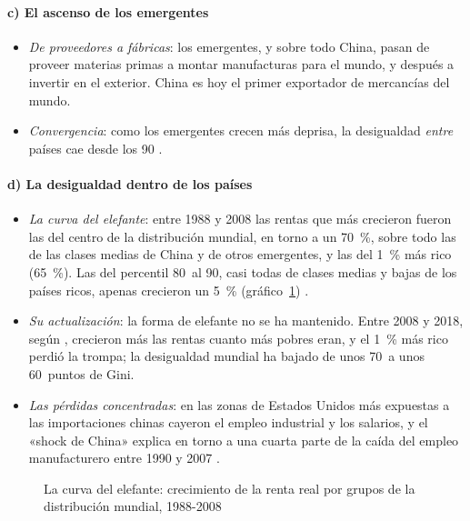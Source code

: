 \documentclass[11pt]{article}
\begin{document}
\paragraph{c) El ascenso de los emergentes}

\begin{itemize}
\item \emph{De proveedores a fábricas}: los emergentes, y sobre todo China, pasan de proveer materias primas a montar manufacturas para el mundo, y después a invertir en el exterior. China es hoy el primer exportador de mercancías del mundo\nocite{OMC2026GTOS}.
\item \emph{Convergencia}: como los emergentes crecen más deprisa, la desigualdad \emph{entre} países cae desde los 90\nocite{Milanovic2016} .
\end{itemize}

\paragraph{d) La desigualdad dentro de los países}

\begin{itemize}
\item \emph{La curva del elefante}: entre 1988 y 2008 las rentas que más crecieron fueron las del centro de la distribución mundial, en torno a un 70~\%, sobre todo las de las clases medias de China y de otros emergentes, y las del 1~\% más rico (65~\%). Las del percentil 80~al 90, casi todas de clases medias y bajas de los países ricos, apenas crecieron un 5~\% (gráfico~\ref{fig:elefante})\nocite{LaknerMilanovic2016} .
\item \emph{Su actualización}: la forma de elefante no se ha mantenido. Entre 2008 y 2018, según \textcite{Milanovic2024ThreeEras}, crecieron más las rentas cuanto más pobres eran, y el 1~\% más rico perdió la trompa; la desigualdad mundial ha bajado de unos 70~a unos 60~puntos de Gini.
\item \emph{Las pérdidas concentradas}: en las zonas de Estados Unidos más expuestas a las importaciones chinas cayeron el empleo industrial y los salarios, y el «shock de China» explica en torno a una cuarta parte de la caída del empleo manufacturero entre 1990 y 2007\nocite{AutorDornHanson2013China} .
\end{itemize}

\begin{figure}[H]
\centering
\caption{La curva del elefante: crecimiento de la renta real por grupos de la distribución mundial, 1988-2008}\label{fig:elefante}
\end{figure}
\end{document}
